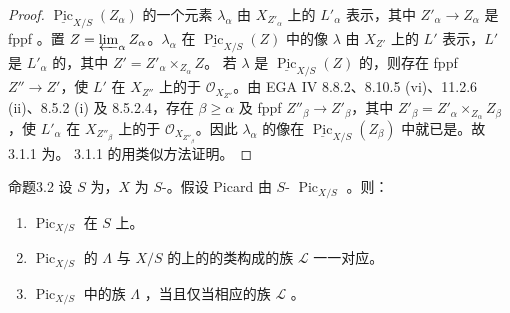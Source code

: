 \begin{proof}
$\underline{\operatorname{Pic}}_{X/S}(Z_\alpha)$ 的一个元素 $\lambda_\alpha$ 由 $X_{Z'_\alpha}$ 上的 $L'_\alpha$ 表示，其中 $Z'_\alpha\to Z_\alpha$ 是 fppf 。置 $Z=\varprojlim_\alpha Z_\alpha$。$\lambda_\alpha$ 在 $\underline{\operatorname{Pic}}_{X/S}(Z)$ 中的像 $\lambda$ 由 $X_{Z'}$ 上的 $L'$ 表示，$L'$ 是 $L'_\alpha$ 的，其中 $Z'=Z'_\alpha\times_{Z_\alpha}Z$。
若 $\lambda$ 是 $\underline{\operatorname{Pic}}_{X/S}(Z)$ 的，则存在 fppf  $Z''\to Z'$，使 $L'$ 在 $X_{Z''}$ 上的于 $\mathcal O_{X_{Z''}}$。由 EGA IV 8.8.2、8.10.5 (vi)、11.2.6 (ii)、8.5.2 (i) 及 8.5.2.4，存在 $\beta\geq\alpha$ 及 fppf  $Z''_\beta\to Z'_\beta$，其中 $Z'_\beta=Z'_\alpha\times_{Z_\alpha}Z_\beta$，使 $L'_\alpha$ 在 $X_{Z''_\beta}$ 上的于 $\mathcal O_{X_{Z''_\beta}}$。因此 $\lambda_\alpha$ 的像在 $\underline{\operatorname{Pic}}_{X/S}(Z_\beta)$ 中就已是。故 3.1.1 为。
3.1.1 的用类似方法证明。
\end{proof}
\begin{SGAresult}{命题}{3.2}
设 $S$ 为，$X$ 为 $S$-。假设 Picard 由 $S$- $\operatorname{Pic}_{X/S}$ 。则：
\begin{enumerate}
\item[(i)] $\operatorname{Pic}_{X/S}$ 在 $S$ 上。
\item[(ii)] $\operatorname{Pic}_{X/S}$ 的 $\Lambda$ 与 $X/S$ 的上的的类构成的族 $\mathscr L$ 一一对应。
\item[(iii)] $\operatorname{Pic}_{X/S}$ 中的族 $\Lambda$ ，当且仅当相应的族 $\mathscr L$ 。
\end{enumerate}
\end{SGAresult}
